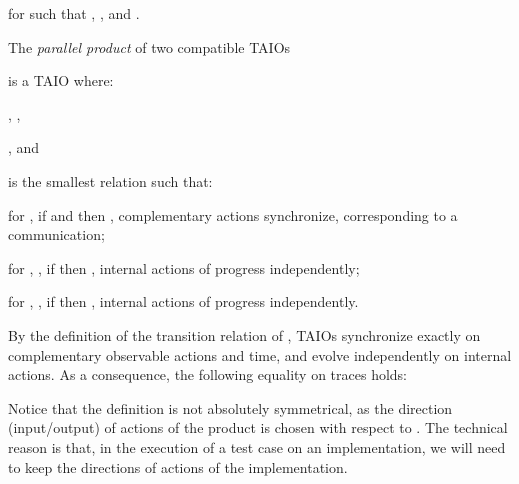 \documentclass{LMCS}
\theoremstyle{plain}\newtheorem{proposition}[thm]{Proposition}
\begin{document}
  for  such that ,
  ,
   and
  . 
  \begin{defi}
\label{def:product}
 The \emph{parallel product} of two compatible TAIOs
   
    
is a TAIO  where:
\begin{iteMize}{}
\item , ,
\item , 
 and 

\item 
\item 
\item  
\item  is the smallest relation such that:
\begin{iteMize}{}
\item for ,  
if  and 
 then
, \ie complementary actions synchronize, corresponding to a communication; 
\item for , ,
if 
then 
, 
\ie internal actions of  progress independently;
\item for , ,
if 
then 
, 
\ie internal actions of  progress independently.
\end{iteMize}
\end{iteMize}
\end{defi}\medskip

\noindent By the definition of the transition relation  of ,
TAIOs synchronize exactly on complementary observable actions and time, 
and evolve independently on internal actions. 
As a consequence, the following equality on traces holds:






Notice that the definition is not absolutely symmetrical, 
as the  direction (input/output) of actions of the product is chosen 
with respect to .
The technical reason is that, 
in the execution of a test case on an implementation,
we will need to keep the directions of actions of the implementation. 
\end{document}
